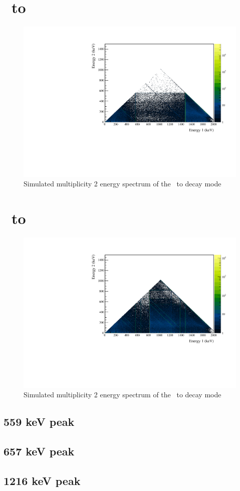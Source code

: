 \documentclass[/main.tex]{subfiles}
\begin{document}
\section{\znbb\ to }
\begin{figure}[!htb]
  \centering
  \includegraphics[width=.8\linewidth]{ESsim_0vBB_ES2_1}
  \caption[Simulation of \znbb\ to ]{
    Simulated multiplicity 2 energy spectrum of the \znbb\ to  decay mode}
\end{figure}


\section{\znbb\ to }
\begin{figure}[!htb]
  \centering
  \includegraphics[width=.8\linewidth]{ESsim_0vBB_ES2_2}
  \caption[Simulation of \znbb\ to ]{
    Simulated multiplicity 2 energy spectrum of the \znbb\ to  decay mode}
\end{figure}

\subsection{559 keV peak}
\subsection{657 keV peak}
\subsection{1216 keV peak}
\end{document}
